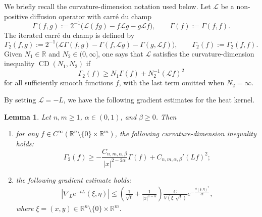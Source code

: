 \documentclass[12pt]{amsart}
\newtheorem{lemma}[theorem]{Lemma}
\begin{document}
We briefly recall the curvature-dimension notation used below. Let $\mathcal L$ be a non-positive diffusion operator with carré du champ
\begin{equation*}
    \Gamma(f,g)
    :=
    2^{-1} \bigl(\mathcal L(fg)-f\mathcal Lg-g \mathcal Lf\bigr),
    \qquad
    \Gamma(f):=\Gamma(f,f).
\end{equation*}
The iterated carré du champ is defined by
\begin{equation*}
    \Gamma_2(f,g)
    :=
    2^{-1} \bigl(\mathcal L\Gamma(f,g)-\Gamma(f, \mathcal Lg)-\Gamma(g, \mathcal Lf)\bigr),
    \qquad
    \Gamma_2(f):=\Gamma_2(f,f).
\end{equation*}
Given $N_1 \in\mathbb R$ and $N_2 \in(0,\infty]$, one says that $\mathcal L$ satisfies the curvature-dimension inequality $\operatorname{CD}(N_1,N_2)$ if
\begin{equation*}
    \Gamma_2(f)
    \ge
    N_1\Gamma(f)+ N_2^{-1} (\mathcal Lf)^2
\end{equation*}
for all sufficiently smooth functions $f$, with the last term omitted when $N_2=\infty$. 









By setting $\mathcal L=-L$, we have the following gradient estimates for the heat kernel.

\begin{lemma}\cite{H4}\label{Grushin_gradient}
Let $n,m\ge 1$, $\alpha\in (0,1)$, and $\beta\ge 0$. Then 
\begin{enumerate}[label=(\roman*)]
    \item for any $f\in C^\infty(\mathbb{R}^n \setminus \{0\} \times \mathbb{R}^m)$, the following curvature-dimension inequality holds:
    \begin{equation*}
        \Gamma_2(f) \ge - \frac{C_{n,m,\alpha,\beta}}{|x|^{2-2\alpha}} \Gamma(f) + C_{n,m,\alpha,\beta}' (Lf)^2;
    \end{equation*}
    \item the following gradient estimate holds:
    \begin{align*}
        \left|\nabla_{L}e^{-tL}(\xi,\eta)\right|
        \le \left(\frac{1}{\sqrt{t}} + \frac{1}{|x|^{1-\alpha}}\right)
        \frac{C}{V(\xi,\sqrt{t})}e^{-\frac{d(\xi,\eta)^2}{ct}},
    \end{align*}
    where $\xi = (x,y) \in \mathbb{R}^n \setminus \{0\} \times \mathbb{R}^m$.
\end{enumerate}
\end{lemma}
\end{document}
